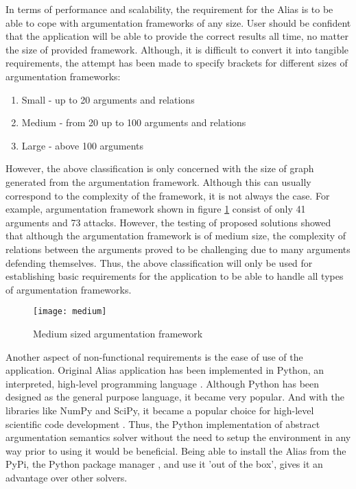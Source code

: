 In terms of performance and scalability, the requirement for the Alias is to be able to cope with argumentation frameworks of any size. User should be confident that the application will be able to provide the correct results all time, no matter the size of provided framework. Although, it is difficult to convert it into tangible requirements, the attempt has been made to specify brackets for different sizes of argumentation frameworks: 

\begin{enumerate}
	\item Small - up to 20 arguments and relations
	\item Medium - from 20 up to 100 arguments and relations
	\item Large - above 100 arguments 
\end{enumerate}

However, the above classification is only concerned with the size of graph generated from the argumentation framework. Although this can usually correspond to the complexity of the framework, it is not always the case. For example, argumentation framework shown in figure \ref{fig:mediumAF} consist of only 41 arguments and 73 attacks. However, the testing of proposed solutions showed that although the argumentation framework is of medium size, the complexity of relations between the arguments proved to be challenging due to many arguments defending themselves. Thus, the above classification will only be used for establishing basic requirements for the application to be able to handle all types of argumentation frameworks. 

\begin{figure}[h]
	\texttt{[image: medium]}
	\caption{Medium sized argumentation framework}
	\label{fig:mediumAF}
\end{figure}

Another aspect of non-functional requirements is the ease of use of the application. Original Alias application has been implemented in Python, an interpreted, high-level programming language \citep{millman2011python}. Although Python has been designed as the general purpose language, it became very popular. And with the libraries like NumPy and SciPy, it became a popular choice for high-level scientific code development \citep{perez2011python}. Thus, the Python implementation of abstract argumentation semantics solver without the need to setup the environment in any way prior to using it would be beneficial. Being able to install the Alias from the PyPi, the Python package manager \citep{pypi}, and use it 'out of the box', gives it an advantage over other solvers.
